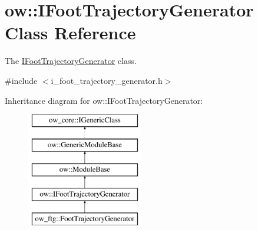 \hypertarget{classow_1_1IFootTrajectoryGenerator}{}\section{ow\+:\+:I\+Foot\+Trajectory\+Generator Class Reference}
\label{classow_1_1IFootTrajectoryGenerator}


The \hyperlink{classow_1_1IFootTrajectoryGenerator}{I\+Foot\+Trajectory\+Generator} class.  




{\ttfamily \#include $<$i\+\_\+foot\+\_\+trajectory\+\_\+generator.\+h$>$}

Inheritance diagram for ow\+:\+:I\+Foot\+Trajectory\+Generator\+:\begin{figure}[H]
\begin{center}
\leavevmode
\includegraphics[height=5.000000cm]{d7/d38/classow_1_1IFootTrajectoryGenerator}
\end{center}
\end{figure}
